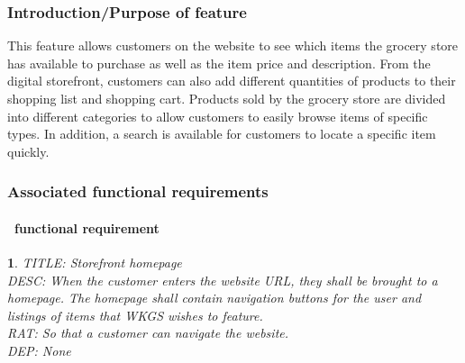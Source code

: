 \documentclass{scrreprt}
\theoremstyle{funreq}
\newtheorem{funreq}{}
\begin{document}
\subsubsection{Introduction/Purpose of feature}
This feature allows customers on the website to see which items the grocery store has available to purchase as well as the item price and description.  From the digital storefront, customers can also add different quantities of products to their shopping list and shopping cart.  Products sold by the grocery store are divided into different categories to allow customers to easily browse items of specific types.  In addition, a search is available for customers to locate a specific item quickly.
\subsubsection{Associated functional requirements}

\paragraph[]{\Subsectionname ~functional requirement }
\begin{funreq}
	\label{store_home}
	TITLE: Storefront homepage\\
	DESC: When the customer enters the website URL, they shall be brought to a homepage.  The homepage shall contain navigation buttons for the user and listings of items that WKGS wishes to feature.\\
	RAT: So that a customer can navigate the website.\\
	DEP: None\\
\end{funreq}
\end{document}
